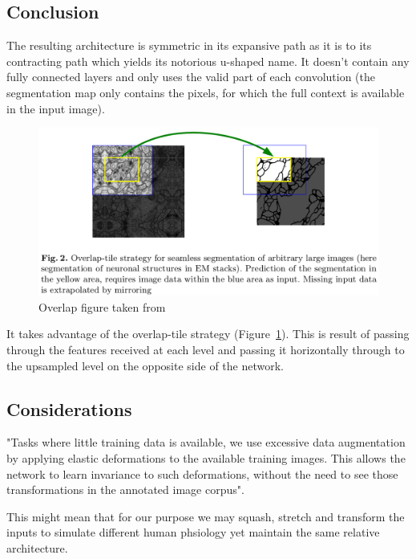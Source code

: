 \documentclass[11pt]{article}
\begin{document}
\subsection{Conclusion}

The resulting architecture is symmetric in its expansive path as it is to its contracting path which yields its notorious u-shaped name. It doesn't contain any fully connected layers and only uses the valid part of each convolution (the segmentation map only contains the pixels, for which the full context is available in the input image).

\begin{figure}[H]
    \centering
    \includegraphics[width=\linewidth]{images/overlap-tile.png}
    \caption{Overlap figure taken from~\cite{U-Net}}
   \label{fig:overlap-tile}
\end{figure}

It takes advantage of the overlap-tile strategy (Figure~\ref{fig:overlap-tile}). This is result of passing through the features received at each level and passing it horizontally through to the upsampled level on the opposite side of the network.

\subsection{Considerations}

"Tasks where little training data is available, we use excessive data augmentation by applying elastic deformations to the available training images. This allows the network to learn invariance to such deformations, without the need to see those transformations in the annotated image corpus".

This might mean that for our purpose we may squash, stretch and transform the inputs to simulate different human phsiology yet maintain the same relative architecture.
\end{document}
